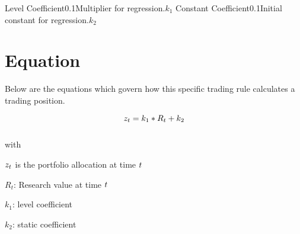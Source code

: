 \documentclass{article}
\begin{document}
\logo
{} %
\tblofcontents



{Level Coefficient}{0.1}{Multiplier for regression.}{$k_1$}
{Constant Coefficient}{0.1}{Initial constant for regression.}{$k_2$}
\stoptable %

\section{Equation}
Below are the equations which govern how this specific trading rule calculates a trading position.

\begin{equation}
z_t = k_1*R_t+k_2
\end{equation}
\\ %
with

$z_t$ is the portfolio allocation at time $t$

$R_t$: Research value at time $t$

$k_1$: level coefficient

$k_2$: static coefficient

\keyterms
\furtherlinks %
\end{document}
